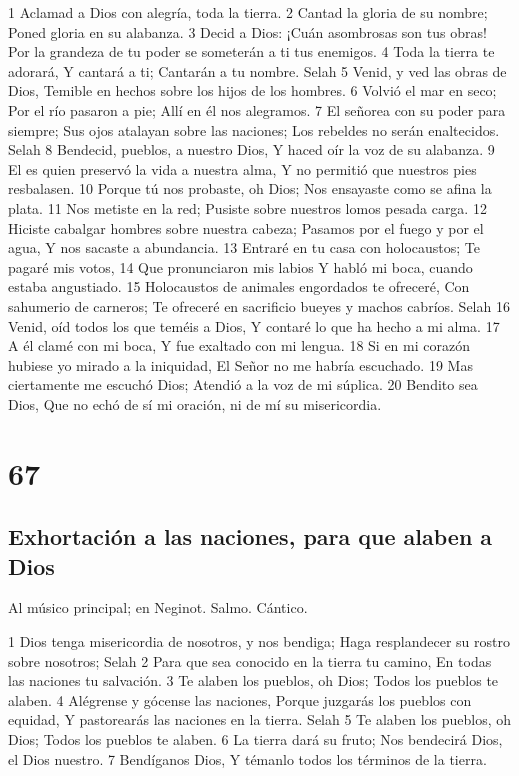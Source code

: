 1 Aclamad a Dios con alegría, toda la tierra.
2 Cantad la gloria de su nombre;
Poned gloria en su alabanza.
3 Decid a Dios: ¡Cuán asombrosas son tus obras!
Por la grandeza de tu poder se someterán a ti tus enemigos.
4 Toda la tierra te adorará,
Y cantará a ti;
Cantarán a tu nombre. Selah
5 Venid, y ved las obras de Dios,
Temible en hechos sobre los hijos de los hombres.
6 Volvió el mar en seco;
Por el río pasaron a pie;
Allí en él nos alegramos.
7 El señorea con su poder para siempre;
Sus ojos atalayan sobre las naciones;
Los rebeldes no serán enaltecidos. Selah
8 Bendecid, pueblos, a nuestro Dios,
Y haced oír la voz de su alabanza.
9 El es quien preservó la vida a nuestra alma,
Y no permitió que nuestros pies resbalasen.
10 Porque tú nos probaste, oh Dios;
Nos ensayaste como se afina la plata.
11 Nos metiste en la red;
Pusiste sobre nuestros lomos pesada carga.
12 Hiciste cabalgar hombres sobre nuestra cabeza;
Pasamos por el fuego y por el agua,
Y nos sacaste a abundancia.
13 Entraré en tu casa con holocaustos;
Te pagaré mis votos,
14 Que pronunciaron mis labios
Y habló mi boca, cuando estaba angustiado.
15 Holocaustos de animales engordados te ofreceré,
Con sahumerio de carneros;
Te ofreceré en sacrificio bueyes y machos cabríos. Selah
16 Venid, oíd todos los que teméis a Dios,
Y contaré lo que ha hecho a mi alma.
17 A él clamé con mi boca,
Y fue exaltado con mi lengua.
18 Si en mi corazón hubiese yo mirado a la iniquidad,
El Señor no me habría escuchado.
19 Mas ciertamente me escuchó Dios;
Atendió a la voz de mi súplica.
20 Bendito sea Dios,
Que no echó de sí mi oración, ni de mí su misericordia.

\chapter{67}

\section*{Exhortación a las naciones, para que alaben a Dios}

Al músico principal; en Neginot. Salmo. Cántico.

1 Dios tenga misericordia de nosotros, y nos bendiga;
Haga resplandecer su rostro sobre nosotros; Selah
2 Para que sea conocido en la tierra tu camino,
En todas las naciones tu salvación.
3 Te alaben los pueblos, oh Dios;
Todos los pueblos te alaben.
4 Alégrense y gócense las naciones,
Porque juzgarás los pueblos con equidad,
Y pastorearás las naciones en la tierra. Selah
5 Te alaben los pueblos, oh Dios;
Todos los pueblos te alaben.
6 La tierra dará su fruto;
Nos bendecirá Dios, el Dios nuestro.
7 Bendíganos Dios,
Y témanlo todos los términos de la tierra.

